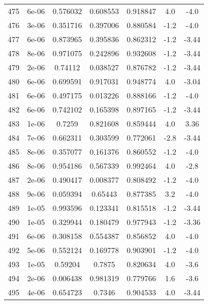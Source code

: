 \begin{table}
\begin{tabular}{c|c|c|c|c|c|c}
475 & 6e-06 & 0.576032 & 0.608553 & 0.918847 & 4.0 & -4.0\\
476 & 3e-06 & 0.351716 & 0.397006 & 0.880584 & -1.2 & -4.0\\
477 & 6e-06 & 0.873965 & 0.395836 & 0.862312 & -1.2 & -3.44\\
478 & 8e-06 & 0.971075 & 0.242896 & 0.932608 & -1.2 & -3.44\\
479 & 2e-06 & 0.74112 & 0.038527 & 0.876782 & -1.2 & -3.44\\
480 & 6e-06 & 0.699591 & 0.917031 & 0.948774 & 4.0 & -3.04\\
481 & 6e-06 & 0.497175 & 0.013226 & 0.888166 & -1.2 & -4.0\\
482 & 6e-06 & 0.742102 & 0.165398 & 0.897165 & -1.2 & -3.44\\
483 & 1e-06 & 0.7259 & 0.821608 & 0.859444 & 4.0 & 3.36\\
484 & 7e-06 & 0.662311 & 0.303599 & 0.772061 & -2.8 & -3.44\\
485 & 8e-06 & 0.357077 & 0.161376 & 0.860552 & -1.2 & -4.0\\
486 & 8e-06 & 0.954186 & 0.567339 & 0.992464 & 4.0 & -2.8\\
487 & 2e-06 & 0.490417 & 0.008377 & 0.808492 & -1.2 & -4.0\\
488 & 9e-06 & 0.059394 & 0.65443 & 0.877385 & 3.2 & -4.0\\
489 & 1e-05 & 0.993596 & 0.123341 & 0.815518 & -1.2 & -3.44\\
490 & 1e-05 & 0.329944 & 0.180479 & 0.977943 & -1.2 & -3.36\\
491 & 6e-06 & 0.308158 & 0.554387 & 0.856852 & 4.0 & -4.0\\
492 & 5e-06 & 0.552124 & 0.169778 & 0.903901 & -1.2 & -4.0\\
493 & 1e-05 & 0.59204 & 0.7875 & 0.820634 & 4.0 & -3.6\\
494 & 2e-06 & 0.006438 & 0.981319 & 0.779766 & 1.6 & -3.6\\
495 & 4e-06 & 0.654723 & 0.7346 & 0.904533 & 4.0 & -3.44\\
\end{tabular}
\end{table}
\newpage
